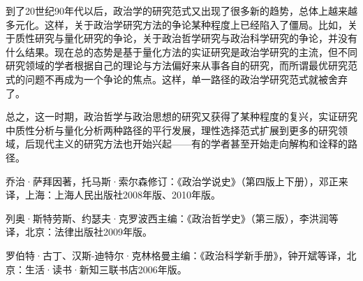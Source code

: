 到了20世纪90年代以后，政治学的研究范式又出现了很多新的趋势，总体上越来越多元化。这样，关于政治学研究方法的争论某种程度上已经陷入了僵局。比如，关于质性研究与量化研究的争论，关于政治哲学研究与政治科学研究的争论，并没有什么结果。现在总的态势是基于量化方法的实证研究是政治学研究的主流，但不同研究领域的学者根据自己的理论与方法偏好来从事各自的研究，而所谓最优研究范式的问题不再成为一个争论的焦点。这样，单一路径的政治学研究范式就被舍弃了。

总之，这一时期，政治哲学与政治思想的研究又获得了某种程度的复兴，实证研究中质性分析与量化分析两种路径的平行发展，理性选择范式扩展到更多的研究领域，后现代主义的研究方法也开始兴起——有的学者甚至开始走向解构和诠释的路径。


乔治·萨拜因著，托马斯·索尔森修订：《政治学说史》（第四版上下册），邓正来译，上海：上海人民出版社2008年版、2010年版。

列奥·斯特劳斯、约瑟夫·克罗波西主编：《政治哲学史》（第三版），李洪润等译，北京：法律出版社2009年版。

罗伯特·古丁、汉斯-迪特尔·克林格曼主编：《政治科学新手册》，钟开斌等译，北京：生活·读书·新知三联书店2006年版。
